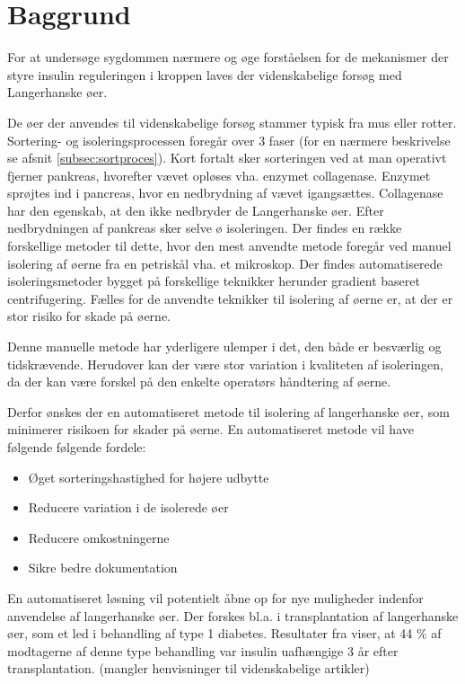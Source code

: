 \section{Baggrund}
For at undersøge sygdommen nærmere og øge forståelsen for de mekanismer der styre insulin reguleringen i kroppen laves der videnskabelige forsøg med Langerhanske øer.

De øer der anvendes til videnskabelige forsøg stammer typisk fra mus eller rotter. Sortering- og isoleringsprocessen foregår over 3 faser (for en nærmere beskrivelse se afsnit \ref{subsec:sortproces}). Kort fortalt sker sorteringen ved at man operativt fjerner pankreas, hvorefter vævet opløses vha. enzymet collagenase. Enzymet sprøjtes ind i pancreas, hvor en nedbrydning af vævet igangsættes. Collagenase har den egenskab, at den ikke nedbryder de Langerhanske øer. Efter nedbrydningen af pankreas sker selve ø isoleringen. Der findes en række forskellige metoder til dette, hvor den mest anvendte metode foregår ved manuel isolering af øerne fra en petriskål vha. et mikroskop. Der findes automatiserede isoleringsmetoder bygget på forskellige teknikker herunder gradient baseret centrifugering. Fælles for de anvendte teknikker til  isolering af øerne er, at der er stor risiko for skade på øerne.

Denne manuelle metode har yderligere ulemper i det, den både er besværlig og tidskrævende. Herudover kan der være stor variation i kvaliteten af isoleringen, da der kan være forskel på den enkelte operatørs håndtering af øerne. 

Derfor ønskes der en automatiseret metode til isolering af langerhanske øer, som minimerer risikoen for skader på øerne. En automatiseret metode vil have følgende følgende fordele: 

\begin{itemize}
\item Øget sorteringshastighed for højere udbytte
\item Reducere variation i de isolerede øer
\item Reducere omkostningerne
\item Sikre bedre dokumentation
\end{itemize} 

En automatiseret løsning vil potentielt åbne op for nye muligheder indenfor anvendelse af langerhanske øer. Der forskes bl.a. i transplantation af langerhanske øer, som et led i behandling af type 1 diabetes. Resultater fra  viser, at 44 \% af modtagerne af denne type behandling var insulin uafhængige 3 år efter transplantation.  (mangler henvisninger til videnskabelige artikler)


 

%
%
%
% 
% 
% 
% 
% 

